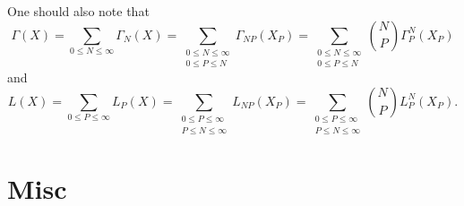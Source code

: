 \documentclass[aps,preprint]{revtex4}%
\begin{document}
One should also note that
\begin{equation}
\Gamma\left(  X\right)  =\sum_{0\leq N\leq\infty}\Gamma_{N}\left(  X\right)
=\sum_{\substack{0\leq N\leq\infty\\0\leq P\leq N}}\Gamma_{NP}\left(
X_{P}\right)  =\sum_{\substack{0\leq N\leq\infty\\0\leq P\leq N}}\binom{N}%
{P}\Gamma_{P}^{N}\left(  X_{P}\right)
\end{equation}
and
\begin{equation}
L\left(  X\right)  =\sum_{0\leq P\leq\infty}L_{P}\left(  X\right)
=\sum_{\substack{0\leq P\leq\infty\\P\leq N\leq\infty}}L_{NP}\left(
X_{P}\right)  =\sum_{\substack{0\leq P\leq\infty\\P\leq N\leq\infty}}\binom
{N}{P}L_{P}^{N}\left(  X_{P}\right)  .
\end{equation}


\section{Misc}
\end{document}
